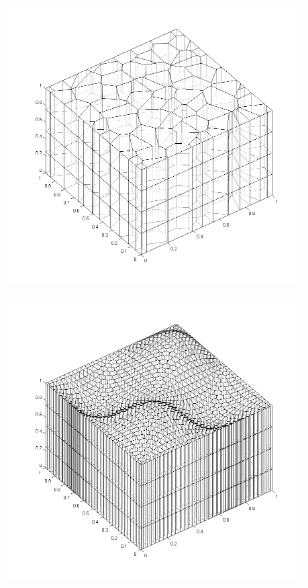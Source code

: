 \begin{figure}
\begin{subfigure}[b]{0.45\textwidth}
		\centering
		\includegraphics[width=0.85\textwidth]{figures/sec_DSA/SIP_poly_extruded_mesh.png}
		\caption{}
	\end{subfigure}
	\vfill
	\begin{subfigure}[b]{0.45\textwidth}
		\centering
		\includegraphics[width=0.85\textwidth]{figures/sec_DSA/SIP_sine_poly_extruded_mesh.png}
		\caption{}
	\end{subfigure}
	\hfill
	\begin{subfigure}[b]{0.45\textwidth}
		\centering

\end{subfigure}
\end{figure}
